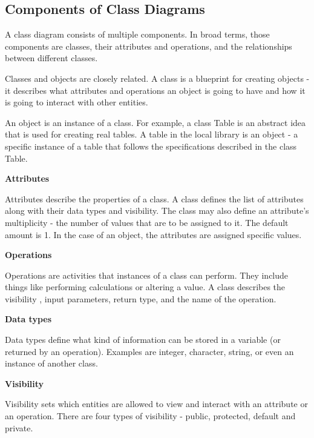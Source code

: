 \subsection{Components of Class Diagrams}

A class diagram consists of multiple components. In broad terms, those components are classes, their attributes and operations, and the relationships between different classes.

Classes and objects are closely related. A class is a blueprint for creating objects - it describes what attributes and operations an object is going to have and how it is going to interact with other entities.

An object is an instance of a class. For example, a class Table is an abstract idea that is used for creating real tables. A table in the local library is an object - a specific instance of a table that follows the specifications described in the class Table.

\textbf{Attributes}

Attributes describe the properties of a class. A class defines the list of attributes along with their data types %
and visibility. %
The class may also define an attribute's multiplicity - the number of values that are to be assigned to it. The default amount is 1. In the case of an object, the attributes are assigned specific values.

\textbf{Operations}

Operations are activities that instances of a class can perform. They include things like performing calculations or altering a value. A class describes the visibility %
, input parameters, return type, and the name of the operation.


\textbf{Data types}

Data types define what kind of information can be stored in a variable (or returned by an operation). Examples are integer, character, string, or even an instance of another class.

\textbf{Visibility}

Visibility sets which entities are allowed to view and interact with an attribute or an operation. There are four types of visibility - public, protected, default and private. 



